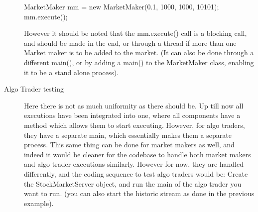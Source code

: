 \documentclass{letter}
\begin{document}
\begin{description}
{  MarketMaker mm = new MarketMaker(0.1, 1000, 1000, 10101); mm.execute();}
  
  However it should be noted that the mm.execute() call is a blocking call,
  and should be made in the end, or through a thread if more than one Market
  maker is to be added to the market. (It can also be done through a different
  main(), or by adding a main() to the MarketMaker class, enabling it to be a
  stand alone process).
  
  \item[Algo Trader testing] Here there is not as much uniformity as there
  should be. Up till now all executions have been integrated into one, where
  all components have a method which allows them to start executing. However,
  for algo traders, they have a separate main, which essentially makes them a
  separate process. This same thing can be done for market makers as well, and
  indeed it would be cleaner for the codebase to handle both market makers and
  algo trader executions similarly. However for now, they are handled
  differently, and the coding sequence to test algo traders would be: Create
  the StockMarketServer object, and run the main of the algo trader you want
  to run. (you can also start the historic stream as done in the previous
  example). 
\end{description}
\end{document}
